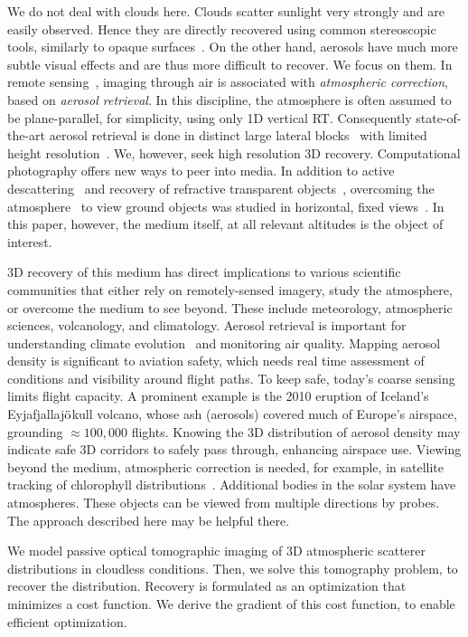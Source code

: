 \documentclass[10pt,letterpaper]{article}
\begin{document}
We do not deal with clouds here. Clouds scatter sunlight very strongly
and are easily observed. Hence they are directly recovered using
common stereoscopic tools, similarly to opaque surfaces~\cite{seiz}.
On the other hand, aerosols have much more subtle visual effects and
are thus more difficult to recover. We focus on them.  In remote
sensing~\cite{diner}, imaging through air is associated with {\em
  atmospheric correction}, based on {\em aerosol retrieval}. In this
discipline, the atmosphere is often assumed to be plane-parallel, for
simplicity, using only 1D vertical RT. Consequently
state-of-the-art aerosol retrieval is done in distinct large lateral
blocks~\cite{Martonchikc} with limited height
resolution~\cite{kalashnikova}. We, however, seek high resolution 3D
recovery. Computational photography offers new ways to peer into
media. In addition to active descattering~\cite{fuchs,kim,Ng1948} and
recovery of refractive transparent objects~\cite{ihrke}, overcoming
the atmosphere~\cite{Joshi2010,Zhu2013} to view ground objects was
studied in horizontal, fixed
views~\cite{fattal,he,Chen,kratz,narasimhan2,oakley,Hschechner2,tan}. In
this paper, however, the medium itself, at all relevant altitudes is
the object of interest.

3D recovery of this medium has direct implications to various
scientific communities that either rely on remotely-sensed imagery,
study the atmosphere, or overcome the medium to see beyond. These
include meteorology, atmospheric sciences, volcanology, and
climatology.  Aerosol retrieval is important for understanding climate
evolution~\cite{Dayan2008,kalashnikova} and monitoring air
quality. Mapping aerosol density is significant to aviation safety,
which needs real time assessment of conditions and visibility around
flight paths. To keep safe, today's coarse sensing limits flight
capacity. A prominent example is the 2010 eruption of Iceland's
Eyjafjallaj$\ddot {\rm o}$kull volcano, whose ash (aerosols) covered
much of Europe's airspace, grounding $\approx 100,000$
flights. Knowing the 3D distribution of aerosol density may indicate
safe 3D corridors to safely pass through, enhancing airspace
use. Viewing beyond the medium, atmospheric correction is needed, for
example, in satellite tracking of chlorophyll
distributions~\cite{johnsen}. Additional bodies in the solar system
have atmospheres. These objects can be viewed from multiple directions
by probes.  The approach described here may be helpful there.

We model passive optical tomographic imaging of 3D atmospheric
scatterer distributions in cloudless conditions. Then, we solve this
tomography problem, to recover the distribution. Recovery is
formulated as an optimization that minimizes a cost function. We
derive the gradient of this cost function, to enable efficient
optimization.
\end{document}
